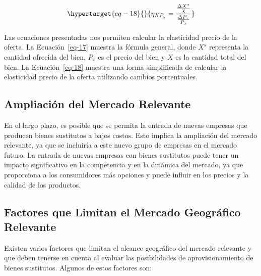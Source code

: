 \documentclass[
  a4paper,
]{article}
\theoremstyle{definition}
\theoremstyle{remark}
\begin{document}
\begin{equation}\protect\hypertarget{eq-18}{}{
\eta_{XP_{y}} = \frac{\frac{\Delta X^s}{X}}{\frac{\Delta P_{x}}{P_{x}}}
}\label{eq-18}\end{equation}

Las ecuaciones presentadas nos permiten calcular la elasticidad precio
de la oferta. La Ecuación~\ref{eq-17} muestra la fórmula general, donde
\(X^s\) representa la cantidad ofrecida del bien, \(P_x\) es el precio
del bien y \(X\) es la cantidad total del bien. La Ecuación~\ref{eq-18}
muestra una forma simplificada de calcular la elasticidad precio de la
oferta utilizando cambios porcentuales.

\hypertarget{ampliaciuxf3n-del-mercado-relevante}{%
\subsection{Ampliación del Mercado
Relevante}\label{ampliaciuxf3n-del-mercado-relevante}}

En el largo plazo, es posible que se permita la entrada de nuevas
empresas que producen bienes sustitutos a bajos costos. Esto implica la
ampliación del mercado relevante, ya que se incluiría a este nuevo grupo
de empresas en el mercado futuro. La entrada de nuevas empresas con
bienes sustitutos puede tener un impacto significativo en la competencia
y en la dinámica del mercado, ya que proporciona a los consumidores más
opciones y puede influir en los precios y la calidad de los productos.

\hypertarget{factores-que-limitan-el-mercado-geogruxe1fico-relevante}{%
\subsection{Factores que Limitan el Mercado Geográfico
Relevante}\label{factores-que-limitan-el-mercado-geogruxe1fico-relevante}}

Existen varios factores que limitan el alcance geográfico del mercado
relevante y que deben tenerse en cuenta al evaluar las posibilidades de
aprovisionamiento de bienes sustitutos. Algunos de estos factores son:
\end{document}
